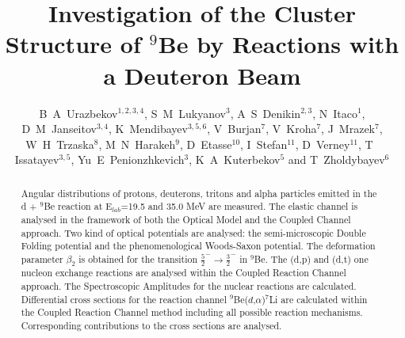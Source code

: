 \documentclass[10pt]{iopart}
\begin{document}
\title[B A Urazbekov \etal ]{Investigation of the Cluster Structure of $^9$Be by Reactions with a Deuteron Beam}

\author{B~A~Urazbekov$^{1,2,3,4}$, S~M~Lukyanov$^3$,  A~S~Denikin$^{2,3}$, N~Itaco$^1$,  D~M~Janseitov$^{3,4}$, K~Mendibayev$^{3,5,6}$, V~Burjan$^7$, V~Kroha$^7$, J~Mrazek$^7$, W~H~Trzaska$^8$, M~N~Harakeh$^9$, D~Etasse$^{10}$, I~Stefan$^{11}$, D~Verney$^{11}$, T~ Issatayev$^{3,5}$, Yu~E~Penionzhkevich$^{3}$, K~A~Kuterbekov$^{5}$ and T~Zholdybayev$^{6}$}

\address{$^1$ Dipartimento di Matematica e Fisica,
Universit\`{a} degli Studi della Campania “Luigi Vanvitelli”, I-8110 Caserta, Italy}
\address{$^2$ Dubna State University, 141982 Dubna, Russia}
\address{$^3$ Joint Institute for nuclear research,  141980 Dubna, Russia}
\address{$^4$ Al-Farabi Kazakh National University, 050040 Almaty, Kazakhstan }
\address{$^5$ L~N~Gumilyov Eurasian National University, 010008 Astana, Kazakhstan }
\address{$^6$ Institute of Nuclear Physics, 050032 Almaty, Kazakhstan}
\address{$^7$ Nuclear Physics Institute CAS, 25068 \v{R}e\v{z}, Czech Republic}
\address{$^8$ Department of Physics, University of Jyv\"askyl\"a, FIN-40014 Jyv\"askyl\"a, Finland}
\address{$^9$ KVI-CART, University of Groningen, 9747 AA Groningen, The Netherlands}
\address{$^{10}$ Normandie Universit\'{e}, ENSICAEN, UNICAEN, CNRS/IN2P3, LPC Caen, 14000 Caen, France}
\address{$^{11}$ Institut de Physique Nucl\'{e}aire, Univ. Paris-Sud, Universit\'{e} Paris-Saclay, F-91406 Orsay, France}

\begin{abstract}
Angular distributions of protons, deuterons, tritons and alpha particles emitted in
the d + $^{9}$Be reaction  at E$_{lab}$=19.5 and 35.0 MeV are measured.
The elastic channel is analysed in the framework of both the Optical Model and  the Coupled Channel approach. 
Two kind of optical potentials are analysed: the semi-microscopic Double Folding potential and the phenomenological Woods-Saxon potential. 
The deformation parameter $\beta_2$ is obtained for the transition $\frac{5}{2}^{-} \rightarrow \frac{3}{2}^{-} $ in $^9$Be. 
The (d,p) and (d,t) one nucleon exchange reactions are analysed within the Coupled Reaction Channel approach. 
The Spectroscopic Amplitudes for the nuclear reactions are calculated. 
Differential cross sections for the reaction channel ${^9}$Be($d$,$\alpha$)$^7$Li are calculated within the Coupled Reaction Channel method including  all possible reaction mechanisms. Corresponding contributions to the cross sections are analysed. 

\end{abstract}
\end{document}
